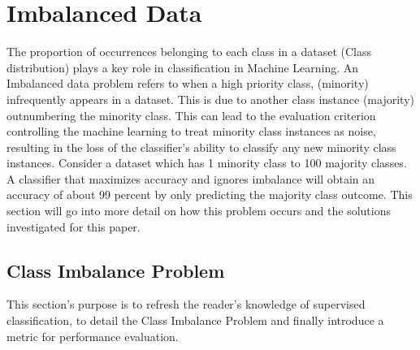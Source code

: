 \section{Imbalanced Data}
The proportion of occurrences belonging to each class in a dataset (Class distribution) plays a key role in classification in Machine Learning. An Imbalanced data problem refers to when a high priority class, (minority) infrequently appears in a dataset. This is due to another class instance (majority) outnumbering the minority class. This can lead to the evaluation criterion controlling the machine learning to treat minority class instances as noise, resulting in the loss of the classifier’s ability to classify any new minority class instances. Consider a dataset which has 1 minority class to 100 majority classes. A classifier that maximizes accuracy and ignores imbalance will obtain an accuracy of about 99 percent by only predicting the majority class outcome. This section will go into more detail on how this problem occurs and the solutions investigated for this paper.

\subsection{Class Imbalance Problem} 
This section’s purpose is to refresh the reader's knowledge of supervised classification, to detail the Class Imbalance Problem and finally introduce a metric for performance evaluation.


